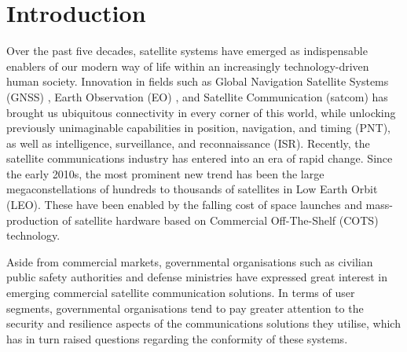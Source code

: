 \documentclass[english, 12pt, a4paper, elec, utf8, a-1b, online]{aaltothesis}
\begin{document}
\cleardoublepage

\section{Introduction}



Over the past five decades, satellite systems have emerged as indispensable enablers of our modern way of life within an increasingly technology-driven human society.
Innovation in fields such as Global Navigation Satellite Systems (GNSS) \cite{oconnor2019economic}, Earth Observation (EO) \cite{lupi2022socioeconomic, tassa2020socioeconomic}, and Satellite Communication (satcom) \cite{x} has brought us ubiquitous connectivity in every corner of this world, while unlocking previously unimaginable capabilities in position, navigation, and timing (PNT), as well as intelligence, surveillance, and reconnaissance (ISR).
Recently, the satellite communications industry has entered into an era of rapid change.
Since the early 2010s, the most prominent new trend has been the large megaconstellations of hundreds to thousands of satellites in Low Earth Orbit (LEO).
These have been enabled by the falling cost of space launches and mass-production of satellite hardware based on Commercial Off-The-Shelf (COTS) technology.

Aside from commercial markets, governmental organisations such as civilian public safety authorities and defense ministries have expressed great interest in emerging commercial satellite communication solutions.
In terms of user segments, governmental organisations tend to pay greater attention to the security and resilience aspects of the communications solutions they utilise, which has in turn raised questions regarding the conformity of these systems.
\end{document}
